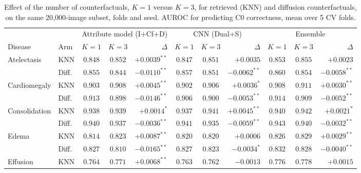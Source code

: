 \begin{table}[htbp]
\centering
\small
\caption{Effect of the number of counterfactuals, $K=1$ versus $K=3$, for retrieved (KNN) and diffusion counterfactuals, on the same 20{,}000-image subset, folds and seed. AUROC for predicting C0 correctness, mean over 5 CV folds.}
\label{tab:k_arm_sub20k}
\begin{threeparttable}
\begin{tabular}{ll|ccr|ccr|ccr}
\toprule
\multicolumn{2}{c|}{} & \multicolumn{3}{c|}{Attribute model (I+Cf+D)} & \multicolumn{3}{c|}{CNN (Dual+S)} & \multicolumn{3}{c}{Ensemble} \\
\cmidrule(lr){3-5} \cmidrule(lr){6-8} \cmidrule(l){9-11}
Disease & Arm & $K{=}1$ & $K{=}3$ & $\Delta$ & $K{=}1$ & $K{=}3$ & $\Delta$ & $K{=}1$ & $K{=}3$ & $\Delta$ \\
\midrule
\multirow{2}{*}{Atelectasis} & KNN & $0.848$ & $0.852$ & $\mathbf{+0.0039}^{**}$ & $0.847$ & $0.851$ & $+0.0035$ & $0.853$ & $0.855$ & $+0.0023$ \\
 & Diff. & $0.855$ & $0.844$ & $\mathbf{-0.0110}^{**}$ & $0.857$ & $0.851$ & $\mathbf{-0.0062}^{**}$ & $0.860$ & $0.854$ & $\mathbf{-0.0058}^{**}$ \\
\midrule
\multirow{2}{*}{Cardiomegaly} & KNN & $0.903$ & $0.908$ & $\mathbf{+0.0045}^{**}$ & $0.902$ & $0.906$ & $\mathbf{+0.0036}^{*}$ & $0.908$ & $0.911$ & $\mathbf{+0.0030}^{**}$ \\
 & Diff. & $0.913$ & $0.898$ & $\mathbf{-0.0146}^{**}$ & $0.906$ & $0.900$ & $\mathbf{-0.0053}^{**}$ & $0.914$ & $0.909$ & $\mathbf{-0.0052}^{**}$ \\
\midrule
\multirow{2}{*}{Consolidation} & KNN & $0.938$ & $0.939$ & $\mathbf{+0.0014}^{*}$ & $0.937$ & $0.941$ & $\mathbf{+0.0045}^{**}$ & $0.940$ & $0.942$ & $\mathbf{+0.0021}^{*}$ \\
 & Diff. & $0.940$ & $0.937$ & $\mathbf{-0.0036}^{**}$ & $0.941$ & $0.935$ & $\mathbf{-0.0059}^{**}$ & $0.943$ & $0.940$ & $\mathbf{-0.0032}^{**}$ \\
\midrule
\multirow{2}{*}{Edema} & KNN & $0.814$ & $0.823$ & $\mathbf{+0.0087}^{**}$ & $0.820$ & $0.820$ & $+0.0006$ & $0.826$ & $0.829$ & $\mathbf{+0.0029}^{**}$ \\
 & Diff. & $0.827$ & $0.810$ & $\mathbf{-0.0165}^{**}$ & $0.827$ & $0.823$ & $\mathbf{-0.0034}^{*}$ & $0.832$ & $0.828$ & $\mathbf{-0.0040}^{**}$ \\
\midrule
\multirow{2}{*}{Effusion} & KNN & $0.764$ & $0.771$ & $\mathbf{+0.0068}^{**}$ & $0.763$ & $0.762$ & $-0.0013$ & $0.776$ & $0.778$ & $+0.0015$ \\

\end{tabular}
\end{threeparttable}
\end{table}
